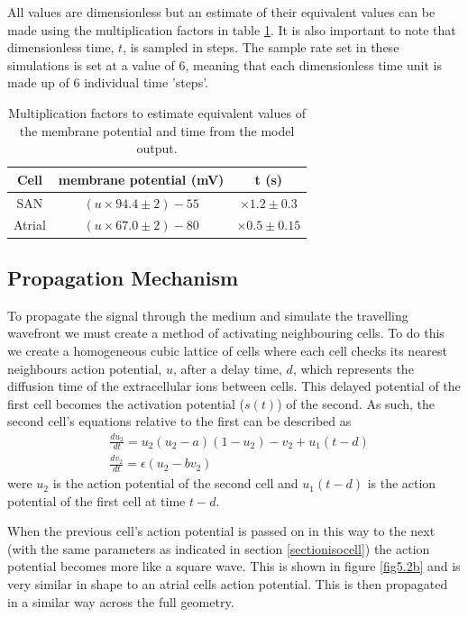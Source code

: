 All values are dimensionless but an estimate of their equivalent values can be made using the multiplication factors in table \ref{tabdimensionless}. It is also important to note that dimensionless time, $t$, is sampled in steps. The sample rate set in these simulations is set at a value of 6, meaning that each dimensionless time unit is made up of 6 individual time 'steps'.

\begin{table}[H]
    \centering
    \begin{tabular}{||c c c||} 
 \hline
 Cell & membrane potential (mV) & t (s) \\ [0.5ex] 
 \hline\hline
 SAN & $(u\times94.4\pm 2)-55$ & $\times1.2\pm 0.3$\\ 
 \hline
 Atrial & $(u\times67.0\pm 2)-80$ & $\times0.5\pm 0.15$\\
 \hline
    \end{tabular}
    \caption{Multiplication factors to estimate equivalent values of the membrane potential and time from the model output.}
    \label{tabdimensionless}
\end{table}

\subsection{Propagation Mechanism}
To propagate the signal through the medium and simulate the travelling wavefront we must create a method of activating neighbouring cells. To do this we create a homogeneous cubic lattice of cells where each cell checks its nearest neighbours action potential, $u$, after a delay time, $d$, which represents the diffusion time of the extracellular ions between cells. This delayed potential of the first cell becomes the activation potential ($s(t)$) of the second. As such, the second cell's equations relative to the first can be described as
\begin{equation}
    \begin{split}
        & \frac{du_2}{dt}=u_2(u_2-a)(1-u_2)-v_2+u_1(t-d) \\
        & \frac{dv_2}{dt}=\epsilon(u_2-bv_2)
    \end{split}
\end{equation}
were $u_2$ is the action potential of the second cell and $u_1(t-d)$ is the action potential of the first cell at time $t-d$. \par

When the previous cell's action potential is passed on in this way to the next (with the same parameters as indicated in section \ref{sectionisocell}) the action potential becomes more like a square wave. This is shown in figure \ref{fig5.2b} and is very similar in shape to an atrial cells action potential. This is then propagated in a similar way across the full geometry.

